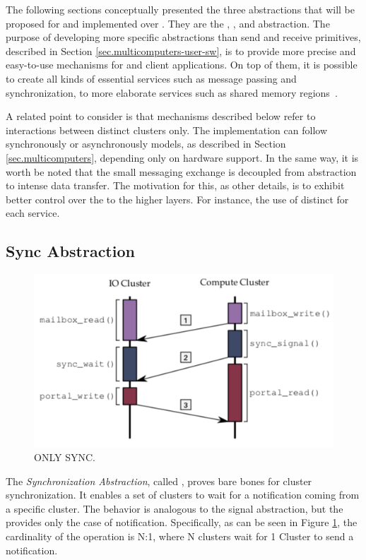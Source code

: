 	The following sections conceptually presented the three abstractions
	that will be proposed for \hal and implemented over \mppa.
	They are the \sync, \mailbox, and \portal abstraction.
	The purpose of developing more specific abstractions than
	send and receive primitives, described in Section \ref{sec.multicomputers-user-sw},
	is to provide more precise and easy-to-use mechanisms for
	\os and client applications.
	On top of them, it is possible to create all kinds of essential
	services such as message passing and synchronization,
	to more elaborate services such as shared memory regions~\cite{rem}.

	A related point to consider is that mechanisms described below refer
	to interactions between distinct clusters only.
	The implementation can follow synchronously or asynchronously models,
	as described in Section \ref{sec.multicomputers}, depending only on hardware support.
	In the same way, it is worth be noted that the small messaging exchange
	is decoupled from abstraction to intense data transfer.
	The motivation for this, as other details, is to exhibit better control
	over the \qos to the higher layers.
	For instance, the use of distinct \nocs for each service.

		\subsection{Sync Abstraction}
		\label{sec.sync-abs}

			\begin{figure}[h]
				\centering
				\includegraphics[width=.7\textwidth]{images/conceptual-sync.png}

				\caption{
					ONLY SYNC.
				}\par
				\label{fig.conpt_sync}
			\end{figure}

			The \textit{Synchronization Abstraction}, called \sync, proves bare bones
			for cluster synchronization.
			It enables a set of clusters to wait for a notification coming from a
			specific cluster.
			The behavior is analogous to the \posix signal abstraction, but the \sync
			provides only the case of notification.
			Specifically, as can be seen in Figure \ref{fig.conpt_sync}, the
			cardinality of the operation is N:1, where N clusters wait for 1 Cluster
			to send a notification.

